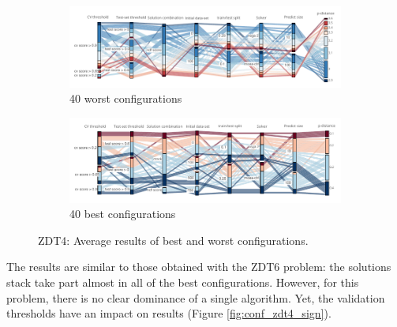             \begin{figure}[h!]
                \centering
                \begin{subfigure}{\textwidth}
                    \includegraphics[width=\textwidth]{content/images/conf_zdt4_worst}
                    \caption{40 worst configurations}
                    \label{fig:conf_zdt4_worst}
                \end{subfigure} 
                \begin{subfigure}{\textwidth}
                    \includegraphics[width=\textwidth]{content/images/conf_zdt4_best}
                    \caption{40 best configurations}
                    \label{fig:conf_zdt4_best}
                \end{subfigure} 
        
                \caption[ZDT4: Average results of best and worst configurations.]{ZDT4: Average results of best and worst configurations.}
                \label{fig:conf_zdt4}    
            \end{figure}
    
    The results are similar to those obtained with the ZDT6 problem: the solutions stack take part almost in all of the best configurations. However, for this problem, there is no clear dominance of a single algorithm. Yet, the validation thresholds have an impact on results (Figure \ref{fig:conf_zdt4_sign}). 

